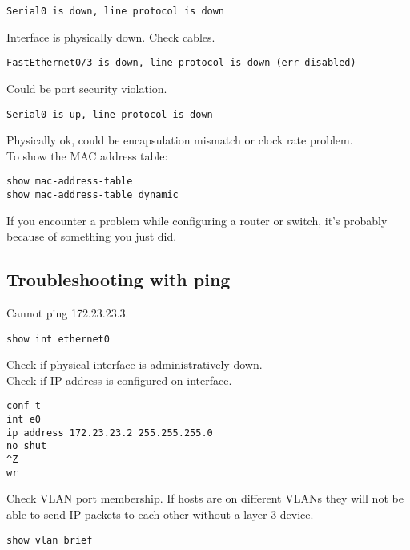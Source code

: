 \begin{verbatim}
Serial0 is down, line protocol is down
\end{verbatim}

Interface is physically down. Check cables.

\begin{verbatim}
FastEthernet0/3 is down, line protocol is down (err-disabled)
\end{verbatim}

Could be port security violation.

\begin{verbatim}
Serial0 is up, line protocol is down
\end{verbatim}

Physically ok, could be encapsulation mismatch or clock rate problem.\\

To show the MAC address table:

\begin{verbatim}
show mac-address-table
show mac-address-table dynamic
\end{verbatim}

If you encounter a problem while configuring a router or switch, it's probably
because of something you just did.

\subsection{Troubleshooting with ping}

Cannot ping 172.23.23.3.

\begin{verbatim}
show int ethernet0  
\end{verbatim}

Check if physical interface is administratively down.\\

Check if IP address is configured on interface.

\begin{verbatim}
conf t
int e0
ip address 172.23.23.2 255.255.255.0
no shut
^Z
wr
\end{verbatim}

Check VLAN port membership. If hosts are on different VLANs they will not be
able to send IP packets to each other without a layer 3 device.

\begin{verbatim}
show vlan brief
\end{verbatim}

